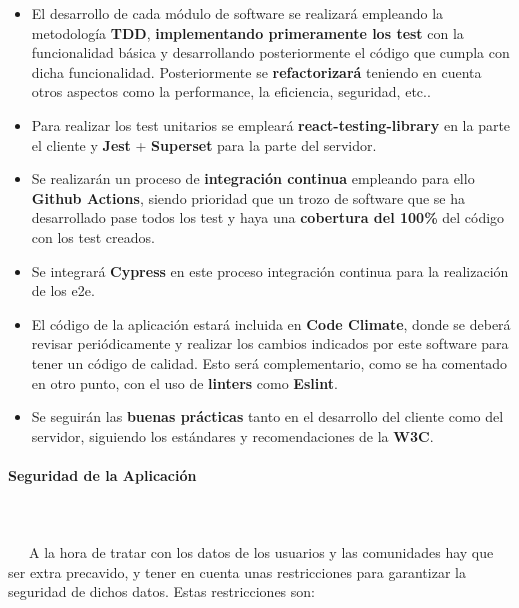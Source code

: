 \begin{itemize}
	\item El desarrollo de cada módulo de software se realizará empleando la metodología \textbf{TDD}, \textbf{implementando primeramente los test} con la funcionalidad básica y desarrollando posteriormente el código que cumpla con dicha funcionalidad. Posteriormente se \textbf{refactorizará} teniendo en cuenta otros aspectos como la performance, la eficiencia, seguridad, etc..
	
	\item Para realizar los test unitarios se empleará \textbf{react-testing-library} en la parte el cliente y \textbf{Jest} + \textbf{Superset} para la parte del servidor.
	
	\item Se realizarán un proceso de \textbf{integración continua} empleando para ello \textbf{Github Actions}, siendo prioridad que un trozo de software que se ha desarrollado pase todos los test y haya una \textbf{cobertura del 100\%} del código con los test creados.
	
	\item Se integrará \textbf{Cypress} en este proceso integración continua para la realización de los \gls{e2e}.
	
	\item El código de la aplicación estará incluida en \textbf{Code Climate}, donde se deberá revisar periódicamente y realizar los cambios indicados por este software para tener un código de calidad. Esto será complementario, como se ha comentado en otro punto, con el uso de \textbf{linters} como \textbf{Eslint}.
	
	\item Se seguirán las \textbf{buenas prácticas} tanto en el desarrollo del cliente como del servidor, siguiendo los estándares y recomendaciones de la \textbf{W3C}.
\end{itemize}

\paragraph{Seguridad de la Aplicación}
~\\\\
\-\ \-\ \-\ A la hora de tratar con los datos de los usuarios y las comunidades hay que ser extra precavido, y tener en cuenta unas restricciones para garantizar la seguridad de dichos datos. Estas restricciones son:

